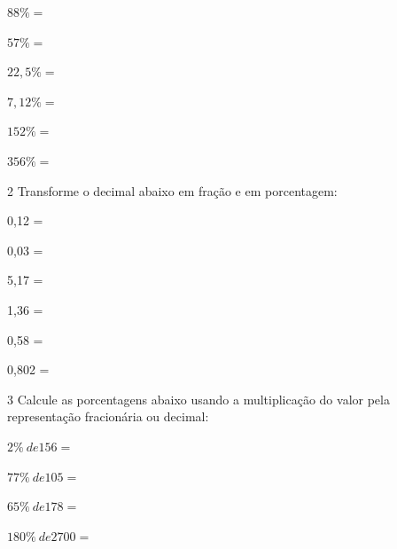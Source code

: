 \begin{multicols}{2}
\begin{escolha}[itemsep=0pt]
\item  $88\% =$  \\
\item  $57\% =$  \\
\item  $22,5\% =$  \\
\item  $7,12\% =$   \\
\item  $152\% =$  \\
\item  $356\% =$  
\end{escolha}
\end{multicols}


\num{2} Transforme o decimal abaixo em fração e em porcentagem:

\begin{multicols}{2}
\begin{escolha}[itemsep=0pt]
  \item 0,12 =   \\
  \item 0,03 =    \\
  \item 5,17 =    \\
  \item 1,36 =    \\
  \item 0,58 =    \\
  \item 0,802 =  
\end{escolha}
\end{multicols}

\num{3} Calcule as porcentagens abaixo usando a multiplicação do valor pela
representação fracionária ou decimal:

\begin{multicols}{2}
\begin{escolha}[itemsep=0pt]
  \item $2\%\ de 156 =$  \\
  \item $77\%\ de 105 =$  \\
  \item $65\%\ de 178 =$  \\
  \item $180\%\ de 2700 =$  
\end{escolha}
\end{multicols}

